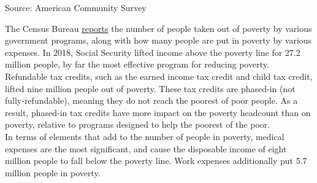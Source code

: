 \documentclass{report}
\begin{document}
{{{\vspace{-3mm}
\hspace{-15mm} 

\vspace{-5mm}
\footnotesize{Source: American Community Survey}


\newpage

\begin{minipage}{0.76\textwidth}


\small The Census Bureau \href{https://www.census.gov/library/publications/2019/demo/p60-268.html}{reports} the number of people taken out of poverty by various government programs, along with how many people are put in poverty by various expenses. In 2018, Social Security lifted income above the poverty line for 27.2 million people, by far the most effective program for reducing poverty. Refundable tax credits, such as the earned income tax credit and child tax credit, lifted nine million people out of poverty. These tax credits are phased-in (not fully-refundable), meaning they do not reach the poorest of poor people. As a result, phased-in tax credits have more impact on the poverty headcount than on poverty, relative to programs designed to help the poorest of the poor.\\

In terms of elements that add to the number of people in poverty, medical expenses are the most significant, and cause the disposable income of eight million people to fall below the poverty line. Work expenses additionally put 5.7 million people in poverty.\\

\vspace{2mm}


\end{minipage}}}}
\end{document}
